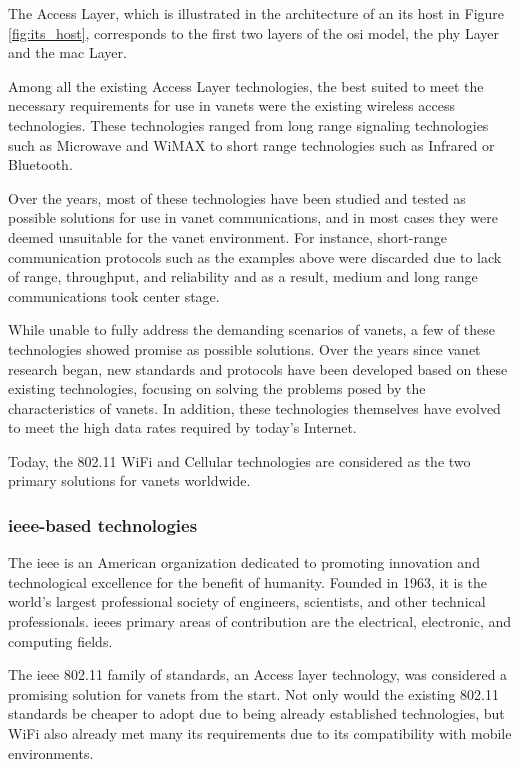 The Access Layer, which is illustrated in the architecture of an \gls{its} host in Figure \ref{fig:its_host}, corresponds to the first two layers of the \gls{osi} model, the \gls{phy} Layer and the \gls{mac} Layer\cite{etsi_intelligent_2020}.

Among all the existing Access Layer technologies, the best suited to meet the necessary requirements for use in \glspl{vanet} were the existing wireless access technologies\cite{al-sultan_comprehensive_2014}. These technologies ranged from long range signaling technologies such as Microwave and WiMAX to short range technologies such as Infrared or Bluetooth\cite{anwer_survey_2014}.

Over the years, most of these technologies have been studied and tested as possible solutions for use in \gls{vanet} communications, and in most cases they were deemed unsuitable for the \gls{vanet} environment. For instance, short-range communication protocols such as the examples above were discarded due to lack of range, throughput, and reliability and as a result, medium and long range communications took center stage.

While unable to fully address the demanding scenarios of \glspl{vanet}, a few of these technologies showed promise as possible solutions. Over the years since \gls{vanet} research began, new standards and protocols have been developed based on these existing technologies, focusing on solving the problems posed by the characteristics of \glspl{vanet}. In addition, these technologies themselves have evolved to meet the high data rates required by today's Internet.

Today, the  802.11 WiFi and Cellular technologies are considered as the two primary solutions for \glspl{vanet} worldwide.

\subsubsection[IEEE-based technologies]{\gls{ieee}-based technologies}
The \gls{ieee} is an American organization dedicated to promoting innovation and technological excellence for the benefit of humanity. Founded in 1963, it is the world's largest professional society of engineers, scientists, and other technical professionals. \glspl{ieee} primary areas of contribution are the electrical, electronic, and computing fields\cite{noauthor_history_nodate}.

The \gls{ieee} 802.11 family of standards, an Access layer technology, was considered a promising solution for \glspl{vanet} from the start. Not only would the existing 802.11 standards be cheaper to adopt due to being already established technologies, but WiFi also already met many \gls{its} requirements due to its compatibility with mobile environments\cite{rohde__schwarz_intelligent_2019}.

